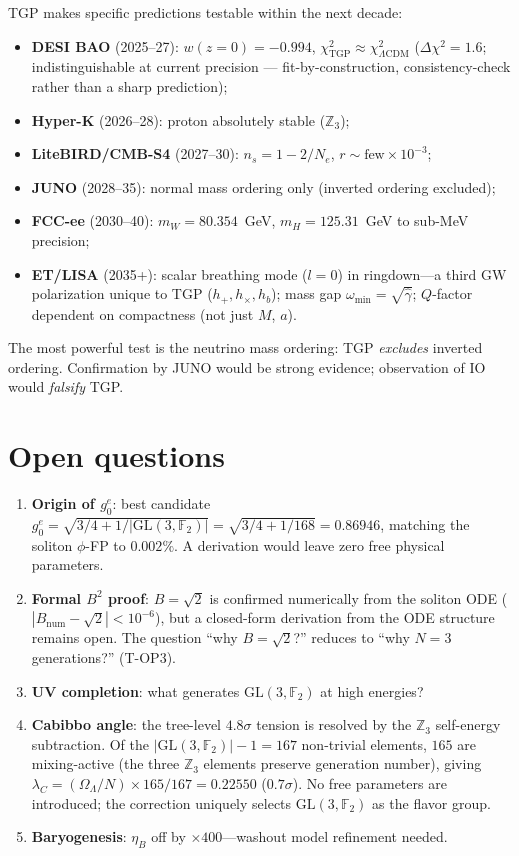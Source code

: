 \documentclass[aps,prl,twocolumn,superscriptaddress,showpacs,floatfix]{revtex4-2}
\newcommand{\gone}{{g_0^e}}
\newcommand{\OL}{\Omega_\Lambda}
\newcommand{\ZZ}{\mathbb{Z}}
\newcommand{\GL}{\mathrm{GL}(3,\mathbb{F}_2)}
\begin{document}
TGP makes specific predictions testable within the next decade:
\begin{itemize}
\item \textbf{DESI BAO} (2025--27): $w(z{=}0) = -0.994$,
  $\chi^2_\mathrm{TGP} \approx \chi^2_{\Lambda\mathrm{CDM}}$
  ($\Delta\chi^2 = 1.6$; indistinguishable at current precision ---
  fit-by-construction, consistency-check rather than a sharp prediction);
\item \textbf{Hyper-K} (2026--28): proton absolutely stable ($\mathbb{Z}_3$);
\item \textbf{LiteBIRD/CMB-S4} (2027--30): $n_s = 1{-}2/N_e$,
  $r \sim \text{few}\times 10^{-3}$;
\item \textbf{JUNO} (2028--35): normal mass ordering only
  (inverted ordering excluded);
\item \textbf{FCC-ee} (2030--40): $m_W = 80.354$~GeV,
  $m_H = 125.31$~GeV to sub-MeV precision;
\item \textbf{ET/LISA} (2035+): scalar breathing mode ($l{=}0$) in
  ringdown---a third GW polarization unique to TGP ($h_+, h_\times,
  h_b$); mass gap $\omega_\mathrm{min} = \sqrt{\hat\gamma}$;
  $Q$-factor dependent on compactness (not just $M$, $a$).
\end{itemize}
The most powerful test is the neutrino mass ordering: TGP \emph{excludes}
inverted ordering. Confirmation by JUNO would be strong evidence;
observation of IO would \emph{falsify} TGP.


\section{Open questions}

\begin{enumerate}
\item \textbf{Origin of $\gone$}: best candidate
  $\gone = \sqrt{3/4 + 1/|\GL|} = \sqrt{3/4 + 1/168} = 0.86946$,
  matching the soliton $\phi$-FP to $0.002\%$.
  A derivation would leave zero free physical parameters.
\item \textbf{Formal $B^2$ proof}: $B = \sqrt{2}$ is confirmed
  numerically from the soliton ODE ($|B_\mathrm{num} - \sqrt{2}| < 10^{-6}$),
  but a closed-form derivation from the ODE structure remains open.
  The question ``why $B = \sqrt{2}$?'' reduces to ``why $N = 3$
  generations?'' (T-OP3).
\item \textbf{UV completion}: what generates $\GL$ at high energies?
\item \textbf{Cabibbo angle}: the tree-level $4.8\sigma$ tension
  is resolved by the $\ZZ_3$ self-energy subtraction.
  Of the $|\GL|-1=167$ non-trivial elements, $165$ are mixing-active
  (the three $\ZZ_3$ elements preserve generation number), giving
  $\lambda_C = (\OL/N)\times 165/167 = 0.22550$ ($0.7\sigma$).
  No free parameters are introduced; the correction uniquely selects
  $\GL$ as the flavor group.
\item \textbf{Baryogenesis}: $\eta_B$ off by $\times 400$---washout
  model refinement needed.
\end{enumerate}
\end{document}
